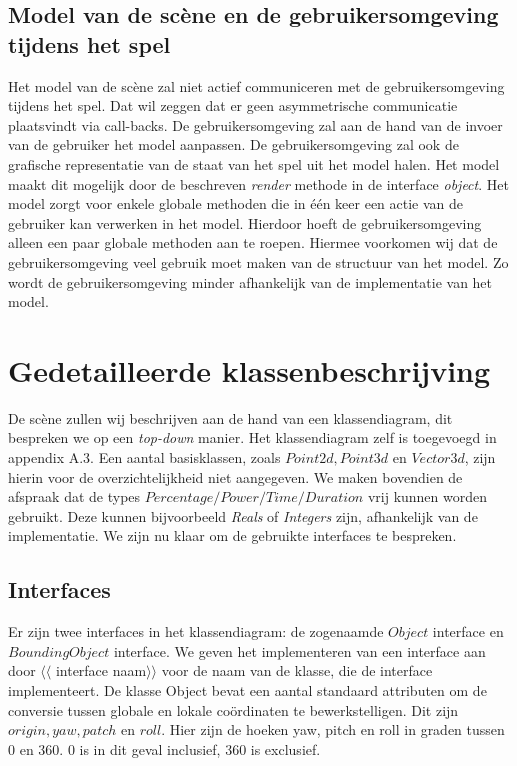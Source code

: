 \documentclass[a4paper,11pt]{article}
\begin{document}
    \subsection{Model van de sc\`ene en de gebruikersomgeving tijdens het spel}
    Het model van de sc\`ene zal niet actief communiceren met de gebruikersomgeving tijdens het spel. Dat wil zeggen dat er geen asymmetrische communicatie plaatsvindt via call-backs. De gebruikersomgeving zal aan de hand van de invoer van de gebruiker het model aanpassen. De gebruikersomgeving zal ook de grafische representatie van de staat van het spel uit het model halen. Het model maakt dit mogelijk door de beschreven \emph{render} methode in de interface \emph{object}. Het model zorgt voor enkele globale methoden die in \'e\'en keer een actie van de gebruiker kan verwerken in het model. Hierdoor hoeft de gebruikersomgeving alleen een paar globale methoden aan te roepen. Hiermee voorkomen wij dat de gebruikersomgeving veel gebruik moet maken van de structuur van het model. Zo wordt de gebruikersomgeving minder afhankelijk van de implementatie van het model.

    \section{Gedetailleerde klassenbeschrijving}
    De sc\`ene zullen wij beschrijven aan de hand van een klassendiagram, dit bespreken we op een \emph{top-down} manier. Het klassendiagram zelf is toegevoegd in appendix A.3. Een aantal basisklassen, zoals $Point2d, Point3d$ en $Vector3d$, zijn hierin voor de overzichtelijkheid niet aangegeven. We maken bovendien de afspraak dat de types $Percentage/Power/Time/Duration$ vrij kunnen worden gebruikt. Deze kunnen bijvoorbeeld \emph{Reals} of \emph{Integers} zijn, afhankelijk van de implementatie. We zijn nu klaar om de gebruikte interfaces te bespreken.

\subsection{Interfaces}
Er zijn twee interfaces in het klassendiagram: de zogenaamde $Object$ interface en $BoundingObject$ interface. We geven het implementeren van een interface aan door $\langle\langle$ interface naam$\rangle \rangle$ voor de naam van de klasse, die de interface implementeert.  De klasse Object bevat een aantal standaard attributen om de conversie tussen globale en lokale co\"ordinaten te bewerkstelligen. Dit zijn $origin, yaw, patch$ en $roll$. Hier zijn de hoeken yaw, pitch en roll in graden tussen 0 en 360. 0 is in dit geval inclusief, 360 is exclusief.
\end{document}
